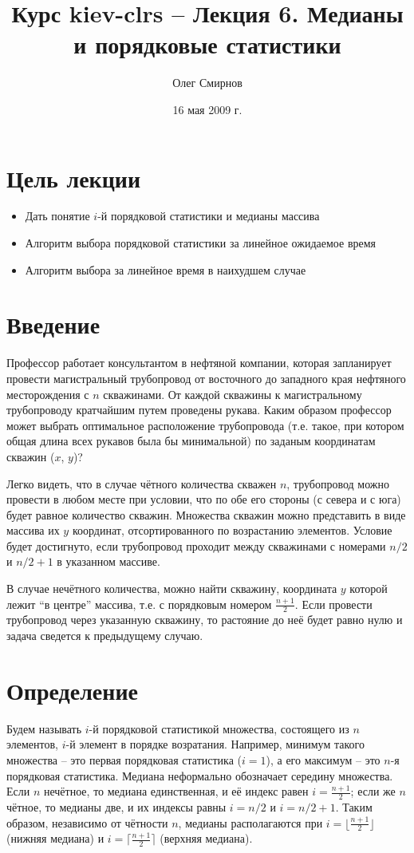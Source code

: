 \documentclass[11pt]{article}
\author{Олег Смирнов}
\title{Курс kiev-clrs -- Лекция 6. Медианы и порядковые статистики}
\date{16 мая 2009 г.}
\begin{document}
\maketitle
\tableofcontents

\newpage
\setlength{\parskip}{1ex plus 0.5ex minus 0.2ex}
\section{Цель лекции}
\begin{itemize}
\item Дать понятие $i$-й порядковой статистики и медианы массива
\item Алгоритм выбора порядковой статистики за линейное ожидаемое время
\item Алгоритм выбора за линейное время в наихудшем случае
\end{itemize}

\section{Введение}

Профессор работает консультантом в нефтяной компании, которая запланирует провести магистральный трубопровод от восточного до западного края нефтяного месторождения с $n$ скважинами. От каждой скважины к магистральному трубопроводу кратчайшим путем проведены рукава. Каким образом профессор может выбрать оптимальное расположение трубопровода (т.е. такое, при котором общая длина всех рукавов была бы минимальной) по заданым координатам скважин ($x$, $y$)?

Легко видеть, что в случае чётного количества скважен $n$, трубопровод можно провести в любом месте при условии, что по обе его стороны (с севера и с юга) будет равное количество скважин. Множества скважин можно представить в виде массива их $y$ координат, отсортированного по возрастанию элементов. Условие будет достигнуто, если трубопровод проходит между скважинами с номерами $n/2$ и $n/2+1$ в указанном массиве.

В случае нечётного количества, можно найти скважину, координата $y$ которой лежит ``в центре'' массива, т.е. с порядковым номером $\frac{n+1}{2}$. Если провести трубопровод через указанную скважину, то растояние до неё будет равно нулю и задача сведется к предыдущему случаю.

\section{Определение}

Будем называть $i$-й порядковой статистикой множества, состоящего из $n$ элементов, $i$-й элемент в порядке возратания. Например, минимум такого множества -- это первая порядковая статистика ($i = 1$), а его максимум -- это $n$-я порядковая статистика. Медиана неформально обозначает середину множества. Если $n$ нечётное, то медиана единственная, и её индекс равен $i = \frac{n+1}{2}$; если же $n$ чётное, то медианы две, и их индексы равны $i=n/2$ и $i=n/2 +1$. Таким образом, независимо от чётности $n$, медианы располагаются при $i = \lfloor \frac{n+1}{2} \rfloor$ (нижняя медиана) и $i = \lceil \frac{n+1}{2} \rceil$ (верхняя медиана).
\end{document}
